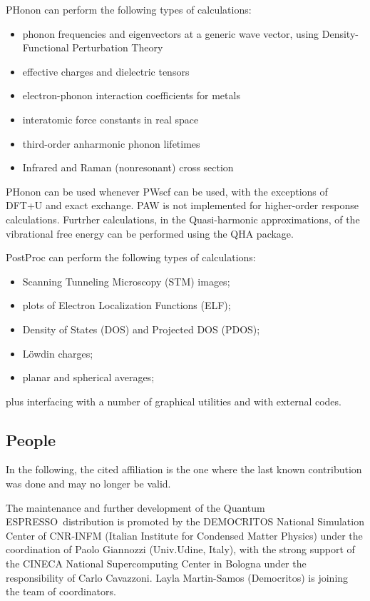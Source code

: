 \documentclass[12pt,a4paper]{article}
\def\qe{{\sc Quantum ESPRESSO}}
\begin{document}
PHonon can perform the following types of calculations:
\begin{itemize}
  \item phonon frequencies and eigenvectors at a generic wave vector,
  using Density-Functional Perturbation Theory
  \item effective charges and dielectric tensors
  \item electron-phonon interaction coefficients for metals
  \item interatomic force constants in real space
  \item third-order anharmonic phonon lifetimes
  \item Infrared and Raman (nonresonant) cross section
\end{itemize}
PHonon can be used whenever PWscf can be used, with the exceptions of
DFT+U and exact exchange. PAW is not implemented for higher-order 
response calculations. Furtrher calculations, in the Quasi-harmonic 
approximations, of the vibrational free energy can be performed
using the QHA  package.

PostProc can perform the following types of calculations:
\begin{itemize}
  \item Scanning Tunneling Microscopy (STM) images;
  \item plots of Electron Localization Functions (ELF);
  \item Density of States (DOS) and Projected DOS (PDOS);
  \item L\"owdin charges;
  \item planar and spherical averages;
\end{itemize}
plus interfacing with a number of graphical utilities and with 
external codes.

\subsection{People}

In the following, the cited affiliation is the one where the last known 
contribution was done and may no longer be valid.

The maintenance and further development of the \qe\ distribution
is promoted by the DEMOCRITOS National Simulation Center 
of CNR-INFM
(Italian Institute for Condensed Matter Physics) under the 
coordination of
Paolo Giannozzi (Univ.Udine, Italy), with the strong support
of the CINECA National Supercomputing Center in Bologna under 
the responsibility of Carlo Cavazzoni. Layla Martin-Samos 
(Democritos) is joining the team of coordinators.
     
\end{document}
